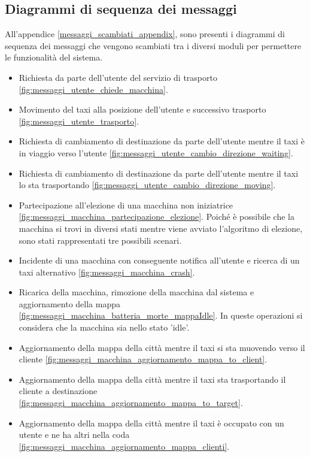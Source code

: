 \subsection{Diagrammi di sequenza dei messaggi}
All'appendice \ref{messaggi_scambiati_appendix}, sono presenti i diagrammi di sequenza dei messaggi che vengono scambiati tra i diversi moduli per permettere le funzionalità del sistema.

\begin{itemize}
	\item Richiesta da parte dell'utente del servizio di trasporto \ref{fig:messaggi_utente_chiede_macchina}.
	\item Movimento del taxi alla posizione dell'utente e successivo trasporto \ref{fig:messaggi_utente_trasporto}.
	\item Richiesta di cambiamento di destinazione da parte dell'utente mentre il taxi è in viaggio verso l'utente \ref{fig:messaggi_utente_cambio_direzione_waiting}.
	\item Richiesta di cambiamento di destinazione da parte dell'utente mentre il taxi lo sta trasportando \ref{fig:messaggi_utente_cambio_direzione_moving}.
	\item Partecipazione all'elezione di una macchina non iniziatrice \ref{fig:messaggi_macchina_partecipazione_elezione}. Poiché è possibile che la macchina si trovi in diversi stati mentre viene avviato l'algoritmo di elezione, sono stati rappresentati tre possibili scenari.
	\item Incidente di una macchina con conseguente notifica all'utente e ricerca di un taxi alternativo \ref{fig:messaggi_macchina_crash}.
	\item Ricarica della macchina, rimozione della macchina dal sistema e aggiornamento della mappa  \ref{fig:messaggi_macchina_batteria_morte_mappaIdle}. In queste operazioni si considera che la macchina sia nello stato 'idle'.
	\item Aggiornamento della mappa della città mentre il taxi si sta muovendo verso il cliente \ref{fig:messaggi_macchina_aggiornamento_mappa_to_client}.
	\item Aggiornamento della mappa della città mentre il taxi sta trasportando il cliente a destinazione \ref{fig:messaggi_macchina_aggiornamento_mappa_to_target}.
	\item Aggiornamento della mappa della città mentre il taxi è occupato con un utente e ne ha altri nella coda \ref{fig:messaggi_macchina_aggiornamento_mappa_clienti}.
\end{itemize}


